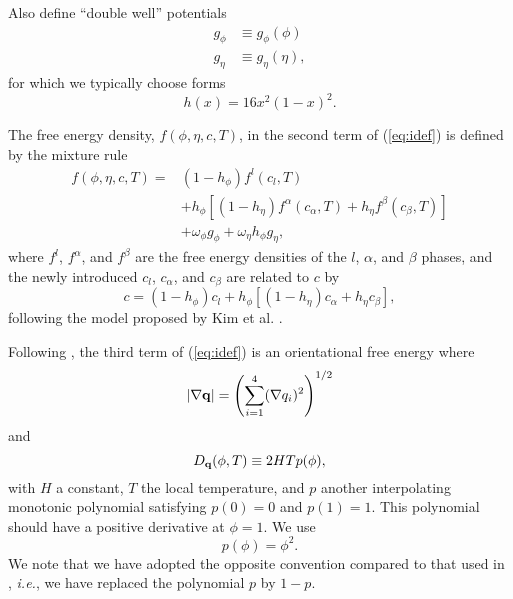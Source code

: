 Also define ``double well'' potentials
%
\begin{align}
  g_\phi & \equiv g_\phi(\phi) \\
  g_\eta & \equiv g_\eta(\eta),
\end{align}
%
for which we typically choose forms
%
\begin{equation}
  h(x) = 16 x^2 ( 1 - x )^2.
\end{equation}
%

The free energy density, $f(\phi,\eta,c,T)$, in the
second term of (\ref{eq:idef}) is defined by the mixture rule
%
\begin{equation}
\begin{split}
  f(\phi,\eta,c,T) = {}
    & ( 1 - h_\phi ) f^l(c_l,T)
    \\
    & + h_\phi \left[
      ( 1 - h_\eta ) f^\alpha(c_\alpha,T)
      + h_\eta f^\beta(c_\beta,T) \right]
    \\
    & + \omega_\phi g_\phi +
      \omega_\eta h_\phi g_\eta ,
\label{eq:fmix}
\end{split}
\end{equation}
%
where $f^l$, $f^\alpha$, and $f^\beta$ are the free energy densities
of the $l$, $\alpha$, and $\beta$ phases, and the newly introduced
$c_l$, $c_\alpha$, and $c_\beta$ are related to $c$ by
%
\begin{equation}
  c = 
    ( 1 - h_\phi ) c_l +
    h_\phi \left[
    ( 1 - h_\eta ) c_\alpha + h_\eta c_\beta
    \right],
\label{eq:cmix}
\end{equation}
%
following the model proposed by Kim et al. \cite{PhysRevE.60.7186}.

Following \cite{0295-5075-71-1-131}, the third term of (\ref{eq:idef})
is an orientational free energy where
%
\begin{equation}
  | \nabla {\bf q} | = \left ( \sum_{i=1}^4 (\nabla q_i)^2 \right )^{1/2}
\end{equation}
%
and
%
\begin{equation}
  D_{\bf q} (\phi,T) \equiv 2HTp(\phi),
\label{eq:dqdef}
\end{equation}
%
with $H$ a constant, $T$ the local temperature, and $p$ another
interpolating monotonic polynomial satisfying $p(0)=0$ and $p(1)=1$.
This polynomial should have a positive derivative at $\phi=1$. We use
%
\begin{equation}
  p(\phi) = \phi^2.
\end{equation}
%
We note that we have adopted the opposite convention compared to that
used in \cite{0295-5075-71-1-131}, {\em i.e.}, we have replaced the
polynomial $p$ by $1-p$.

